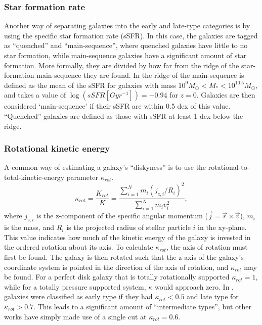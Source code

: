 \subsubsection{Star formation rate}
Another way of separating galaxies into the early and late-type categories is by using the specific star formation rate (sSFR). In this case, the galaxies are tagged as ``quenched'' and ``main-sequence'', where quenched galaxies have little to no star formation, while main-sequence galaxies have a significant amount of star formation. More formally, they are divided by how far from the ridge of the star-formation main-sequence they are found. In \textcite{Genel2017} the ridge of the main-sequence is defined as the mean of the sSFR for galaxies with mass $10^{9} M_{\odot} < M_* < 10^{10.5} M_{\odot}$, and takes a value of $\log (sSFR[Gyr^{-1}]) = -0.94$ for $z=0$. Galaxies are then considered `main-sequence' if their sSFR are within 0.5 dex of this value. ``Quenched'' galaxies are defined as those with sSFR at least 1 dex below the ridge.

\subsubsection{Rotational kinetic energy}
A common way of estimating a galaxy's ``diskyness'' is to use the rotational-to-total-kinetic-energy parameter $\kappa_{rot}$. 
\begin{equation}
    \kappa_{rot} = \frac{K_{rot}}{K} = \frac{\sum_{i=1}^{N} m_i (j_{z, i}/R_i)^2}{\sum_{i=1}^{N} m_i v_i^2},
\end{equation}
where $j_{z, i}$ is the z-component of the specific angular momentum ($\vec{j} = \vec{r} \times \vec{v}$), $m_i$ is the mass, and $R_i$ is the projected radius of stellar particle $i$ in the xy-plane. 
This value indicates how much of the kinetic energy of the galaxy is invested in the ordered rotation about its axis. To calculate $\kappa_{rot}$, the axis of rotation must first be found. The galaxy is then rotated such that the z-axis of the galaxy's coordinate system is pointed in the direction of the axis of rotation, and $\kappa_{rot}$ may be found.
For a perfect disk galaxy that is totally rotationally supported $\kappa_{rot} = 1$, while for a totally pressure supported system, $\kappa$ would approach zero. In \textcite{Sales2012}, galaxies were classified as early type if they had $\kappa_{rot} < 0.5$ and late type for $\kappa_{rot} > 0.7$. This leads to a significant amount of ``intermediate types'', but other works have simply made use of a single cut at $\kappa_{rot} = 0.6$.